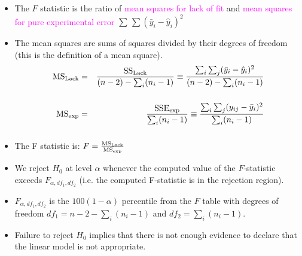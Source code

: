 \documentclass[xcolor=dvipsnames,12pt]{beamer}
\begin{document}
\begin{frame}
\begin{itemize}
\item The $F$ statistic is the
ratio of  \textcolor{magenta}{mean squares for lack of fit} and  \textcolor{magenta}{mean squares for pure
experimental error} $ \sum\,\sum (\bar{y}_i - \hat{y}_i)^2$\\[.1in]
\item The mean squares are sums of squares
divided by their degrees of freedom (this is the definition of a
mean square).\\[.1in]
\begin{eqnarray*}
\rm{MS}_{\rm{Lack}} & = & 
\frac{\rm{SS}_{\rm{Lack}}}{(n-2)-\sum_i(n_i-1)} \equiv
\frac{\sum_i\sum_j(\bar{y}_i-\hat{y}_i)^2}{(n-2)-\sum_i(n_i-1)}\\[.2in]
\rm{MS}_{\rm{exp}} & = &
\frac{\rm{SSE}_{\rm{exp}}}{\sum_i(n_i-1)} \equiv
\frac{\sum_i\sum_j(y_{ij}-\bar{y}_i)^2}{\sum_i(n_i-1)} \\[.1in]
\end{eqnarray*}
\end{itemize}
\end{frame}





\begin{frame}
\begin{itemize}
\item The F statistic is: $
F  =  \frac{\rm{MS}_{\rm{Lack}}}{\rm{MS}_{\rm{exp}}} $\\[.1in]
\item We reject $H_0$ at level $\alpha$ whenever 
the computed value of the  $F$-statistic
exceeds $F_{\alpha,df_1,df_2}$ (i.e. the computed F-statistic is in the rejection region).\\[.1in]
\item  $F_{\alpha,df_1,df_2}$ is the $100(1-\alpha)$ percentile from the  $F$ table
with degrees of freedom 
$df_1 =  n-2 - \sum_i (n_i-1)$ and $ df_2  = \sum_i (n_i-1).$ \\[.1in]
\item Failure to reject $H_0$ implies that there is not enough evidence to
declare that the linear model is not appropriate.\\[.1in]
\end{itemize}
\end{frame}
\end{document}
